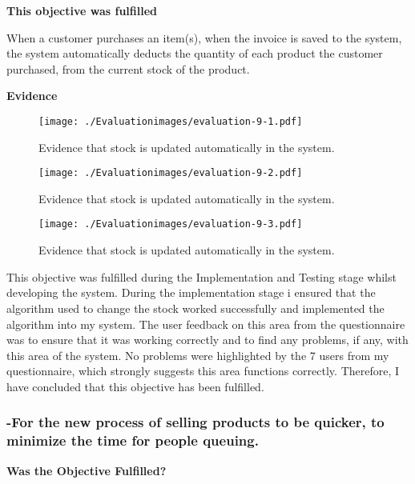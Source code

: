 \textbf{\large{This objective was fulfilled}}

When a customer purchases an item(s), when the invoice is saved to the system, the system automatically deducts the quantity of each product the customer purchased, from the current stock of the product.\newline

\textbf{Evidence} \newline
\label{automatic-stock-evidence}

\begin{figure}[H]
\caption{Evidence that stock is updated automatically in the system.} \label{fig:evaluation-9-1}
\hfill\texttt{[image: ./Evaluationimages/evaluation-9-1.pdf]}
\end{figure}

\begin{figure}[H]
\caption{Evidence that stock is updated automatically in the system.} \label{fig:evaluation-9-2}
\hfill\texttt{[image: ./Evaluationimages/evaluation-9-2.pdf]}
\end{figure}

\begin{figure}[H]
\caption{Evidence that stock is updated automatically in the system.} \label{fig:evaluation-9-3}
\hfill\texttt{[image: ./Evaluationimages/evaluation-9-3.pdf]}
\end{figure}

This objective was fulfilled during the Implementation and Testing stage whilst developing the system. During the implementation stage i ensured that the algorithm used to change the stock worked successfully and implemented the algorithm into my system. The user feedback on this area from the questionnaire was to ensure that it was working correctly and to find any problems, if any, with this area of the system. No problems were highlighted by the 7 users from my questionnaire, which strongly suggests this area functions correctly. Therefore, I have concluded that this objective has been fulfilled.



\pagebreak
\subsubsection{-For the new process of selling products to be quicker, to minimize the time for people queuing.}
\textbf{Was the Objective Fulfilled?} \newline


